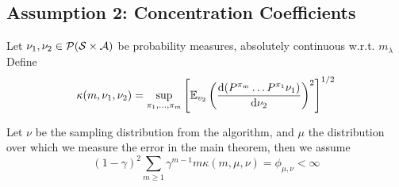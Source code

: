 \subsection{Assumption 2: Concentration Coefficients}

\begin{defn} \label{defn:ccoefs}
  Let $\nu_1, \nu_2 \in \mathcal{P}(\mathcal{S}\times \mathcal{A})$ be probability measures,
  absolutely continuous w.r.t. $m_{\lambda}$
  Define
  \[ \kappa(m, \nu_1, \nu_2) = \sup_{\pi_1, \dots, \pi_m}
    \left[ \mathbb{E}_{v_2} \left( \frac{\mathrm{d} (P^{\pi_m} \dots P^{\pi_1} \nu_1)}
  {\mathrm{d} \nu_2} \right)^2 \right]^{1/2} \]
\end{defn}

\begin{asm}\label{asm:A2}
  Let $\nu$ be the sampling distribution from the algorithm, and $\mu$ the distribution
  over which we measure the error in the main theorem, then we assume
  \[ (1 - \gamma)^2 \sum_{m\geq 1} \gamma^{m-1} m \kappa(m, \mu, \nu)
  = \phi_{\mu, \nu} < \infty \]
\end{asm}


